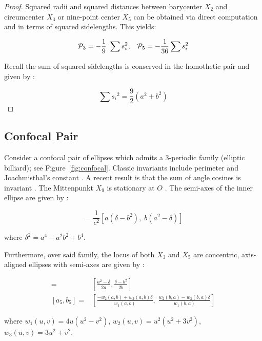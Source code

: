 \begin{proof}
Squared radii and squared distances between barycenter $X_2$ and circumcenter $X_3$ or nine-point center $X_5$ can be obtained via direct computation and in terms of squared sidelengths. This yields:

\[
\P_3 = -\frac{1}{9}\ \sum{ s_i^2},\;\;\;
\P_5= -\frac{1}{36}\sum{s_i^2} \]

Recall the sum of squared sidelengths is conserved in the homothetic pair and given by \cite[Remark 2.1]{reznik2020-similarityII}:

\[  \sum{s_i}^2=\frac{9}{2}(a^2+b^2)\]

\end{proof}

\subsection{Confocal Pair}

Consider a confocal pair of ellipses which admits a 3-periodic family (elliptic billiard); see Figure~\ref{fig:confocal}. Classic invariants include perimeter and Joachmisthal's constant \cite{sergei91}. A recent result is that the sum of angle cosines is invariant \cite{reznik2020-intelligencer,garcia2020-new-properties}. The Mittenpunkt $X_9$ is stationary at $O$ \cite{reznik2020-intelligencer}. The semi-axes of the inner ellipse are given by \cite{garcia2019-incenter}:

\begin{equation}
[a_c,b_c] = \frac{1}{c^2}\left[a(\delta-b^2),\;b(a^2-\delta)\right]
\label{eqn:confocal-axes}
\end{equation} 

\noindent where $\delta^2={a^4-a^2 b^2+b^4}$.

Furthermore, over said family, the locus of both $X_3$ and $X_5$ are concentric, axis-aligned ellipses with semi-axes are given by \cite{garcia2020-ellipses}:

\begin{align*}
    [a_3,b_3]=&\left[\frac{a^2-\delta}{2a},\frac{\delta-b^2}{2b}\right]\\
    [a_5,b_5]=&\left[\frac{- w_2(a,b)+ w_3(a,b) \delta}{ w_1(a,b)},\;\frac{ w_2(b,a)-{w_3(b,a) \delta}}{w_1(b,a)}\right]
\end{align*}

\noindent where $w_1(u,v)=4u(u^2-v^2)$, $w_2(u,v)=u^2(u^2+3v^2)$, $w_3(u,v)=3u^2+ v^2$.

